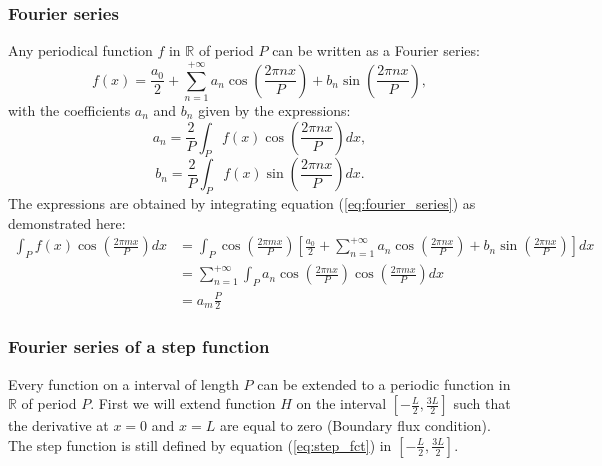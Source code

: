 \subsubsection{Fourier series}
Any periodical function $f$ in $\mathbb{R}$ of period $P$ can be written as a Fourier series:
\begin{equation}
    f(x) =  \frac{a_0}{2} + \sum_{n=1}^{+\infty} a_n \cos\left(\frac{2\pi n x}{P}\right) + b_n \sin\left(\frac{2\pi n x}{P}\right),
    \label{eq:fourier_series}
\end{equation}
with the coefficients $a_n$ and $b_n$ given by the expressions:
\begin{equation}
    a_n = \frac{2}{P} \int_P f(x) \cos\left(\frac{2\pi n x}{P}\right) dx,
    \label{eq:a_n}
\end{equation}
\begin{equation}
    b_n = \frac{2}{P} \int_P f(x) \sin\left(\frac{2\pi n x}{P}\right) dx.
    \label{eq:b_n}
\end{equation}
The expressions are obtained by integrating equation (\ref{eq:fourier_series}) as demonstrated here:
\begin{align*}
    \int_P f(x) \cos\left(\frac{2\pi m x}{P}\right) dx & =  \int_P  \cos\left(\frac{2\pi m x}{P}\right)\left[ \frac{a_0}{2} + \sum_{n=1}^{+\infty} a_n \cos\left(\frac{2\pi n x}{P}\right) + b_n \sin\left(\frac{2\pi n x}{P}\right) \right] dx \\
    &=  \sum_{n=1}^{+\infty} \int_P  a_n \cos\left(\frac{2\pi n x}{P}\right)  \cos\left(\frac{2\pi m x}{P}\right) dx \\
    &= a_m \frac{P}{2}
\end{align*}

\subsubsection{Fourier series of a step function}
Every function on a interval of length $P$ can be extended to a periodic function in $\mathbb{R}$ of period $P$.
First we will extend function $H$ on the interval $[-\frac{L}{2}, \frac{3L}{2}]$ such that the derivative at $x=0$ and $x=L$ are equal to zero (Boundary flux condition). 
The step function is still defined by equation (\ref{eq:step_fct}) in $[-\frac{L}{2}, \frac{3L}{2}]$.

